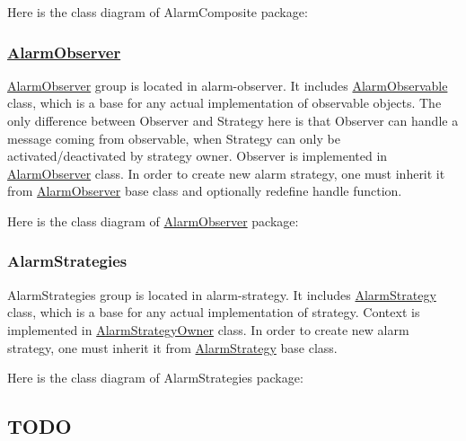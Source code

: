 Here is the class diagram of Alarm\+Composite package\+:



\subsubsection*{\hyperlink{classAlarmObserver}{Alarm\+Observer}}

\hyperlink{classAlarmObserver}{Alarm\+Observer} group is located in {\ttfamily alarm-\/observer}. It includes {\ttfamily \hyperlink{classAlarmObservable}{Alarm\+Observable}} class, which is a base for any actual implementation of observable objects. The only difference between Observer and Strategy here is that Observer can handle a message coming from observable, when Strategy can only be activated/deactivated by strategy owner. Observer is implemented in {\ttfamily \hyperlink{classAlarmObserver}{Alarm\+Observer}} class. In order to create new alarm strategy, one must inherit it from {\ttfamily \hyperlink{classAlarmObserver}{Alarm\+Observer}} base class and optionally redefine {\ttfamily handle function}.

Here is the class diagram of \hyperlink{classAlarmObserver}{Alarm\+Observer} package\+:



\subsubsection*{Alarm\+Strategies}

Alarm\+Strategies group is located in {\ttfamily alarm-\/strategy}. It includes {\ttfamily \hyperlink{classAlarmStrategy}{Alarm\+Strategy}} class, which is a base for any actual implementation of strategy. Context is implemented in {\ttfamily \hyperlink{classAlarmStrategyOwner}{Alarm\+Strategy\+Owner}} class. In order to create new alarm strategy, one must inherit it from {\ttfamily \hyperlink{classAlarmStrategy}{Alarm\+Strategy}} base class.

Here is the class diagram of Alarm\+Strategies package\+:



\subsection*{T\+O\+DO}


